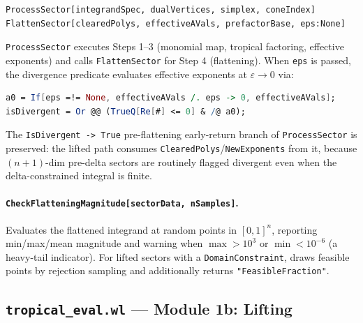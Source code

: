 \documentclass[11pt,a4paper]{article}
\begin{document}
\begin{lstlisting}
ProcessSector[integrandSpec, dualVertices, simplex, coneIndex]
FlattenSector[clearedPolys, effectiveAVals, prefactorBase, eps:None]
\end{lstlisting}

\texttt{ProcessSector} executes Steps 1--3 (monomial map, tropical factoring, effective exponents) and calls \texttt{FlattenSector} for Step 4 (flattening). When \texttt{eps} is passed, the divergence predicate evaluates effective exponents at $\varepsilon\to 0$ via:
\begin{lstlisting}[language=Mathematica]
a0 = If[eps =!= None, effectiveAVals /. eps -> 0, effectiveAVals];
isDivergent = Or @@ (TrueQ[Re[#] <= 0] & /@ a0);
\end{lstlisting}

The \texttt{IsDivergent -> True} pre-flattening early-return branch of \texttt{ProcessSector} is preserved: the lifted path consumes \texttt{ClearedPolys}/\texttt{NewExponents} from it, because $(n{+}1)$-dim pre-delta sectors are routinely flagged divergent even when the delta-constrained integral is finite.

\paragraph{\texttt{CheckFlatteningMagnitude[sectorData, nSamples]}.} Evaluates the flattened integrand at random points in $[0,1]^n$, reporting min/max/mean magnitude and warning when $\max>10^3$ or $\min<10^{-6}$ (a heavy-tail indicator). For lifted sectors with a \texttt{DomainConstraint}, draws feasible points by rejection sampling and additionally returns \texttt{"FeasibleFraction"}.

\subsection{\texttt{tropical\_eval.wl} --- Module 1b: Lifting}
\end{document}

